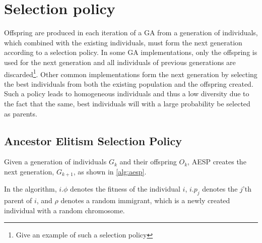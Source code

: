 \section{Selection policy}
Offspring are produced in each iteration of a GA from a generation of individuals, which combined with the existing individuals, must form the next generation according to a selection policy. In some GA implementations, only the offspring is used for the next generation and all individuals of previous generations are discarded\footnote{ Give an example of such a selection policy}. Other common implementations form the next generation by selecting the best individuals from both the existing population and the offspring created\cite{masterThesisGANN}. Such a policy leads to homogeneous individuals and thus a low diversity due to the fact that the same, best individuals will with a large probability be selected as parents.

\subsection{Ancestor Elitism Selection Policy}
Given a generation of individuals $G_k$ and their offspring $O_k$, AESP creates the next generation, $G_{k+1}$, as shown in \cref{alg:aesp}.
%

%
In the algorithm, $i.\phi$ denotes the fitness of the individual $i$, $i.p_j$ denotes the $j$'th parent of $i$, and $\rho$ denotes a random immigrant, which is a newly created individual with a random chromosome.
